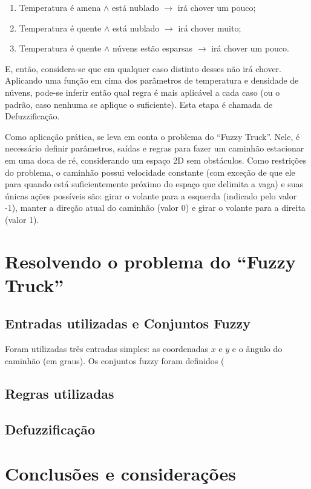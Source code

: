 \documentclass[twocolumn]{article}
\begin{document}
    \begin{enumerate}
        \item Temperatura é amena $\land$ está nublado $\rightarrow$ irá chover
            um pouco;
        \item Temperatura é quente $\land$ está nublado $\rightarrow$ irá
            chover muito;
        \item Temperatura é quente $\land$ núvens estão esparsas $\rightarrow$
            irá chover um pouco.
    \end{enumerate}

    E, então, considera-se que em qualquer caso distinto desses não irá chover.
    Aplicando uma função em cima dos parâmetros de temperatura e densidade de
    núvens, pode-se inferir então qual regra é mais aplicável a cada caso (ou o
    padrão, caso nenhuma se aplique o suficiente). Esta etapa é chamada de
    Defuzzificação.

    Como aplicação prática, se leva em conta o problema do ``Fuzzy Truck''.
    Nele, é necessário definir parâmetros, saídas e regras para fazer um
    caminhão estacionar em uma doca de ré, considerando um espaço 2D sem
    obstáculos. Como restrições do problema, o caminhão possui velocidade
    constante (com exceção de que ele para quando está suficientemente próximo
    do espaço que delimita a vaga) e suas únicas ações possíveis são: girar o
    volante para a esquerda (indicado pelo valor -1), manter a direção atual do
    caminhão (valor 0) e girar o volante para a direita (valor 1).

    \section{Resolvendo o problema do ``Fuzzy Truck''}

    \subsection{Entradas utilizadas e Conjuntos Fuzzy}

    Foram utilizadas três entradas simples: as coordenadas $x$ e $y$ e o ângulo
    do caminhão (em graus). Os conjuntos fuzzy foram definidos (

    \subsection{Regras utilizadas}

    \subsection{Defuzzificação}

    \section{Conclusões e considerações}

    
    
    \nocite{*}
\end{document}
